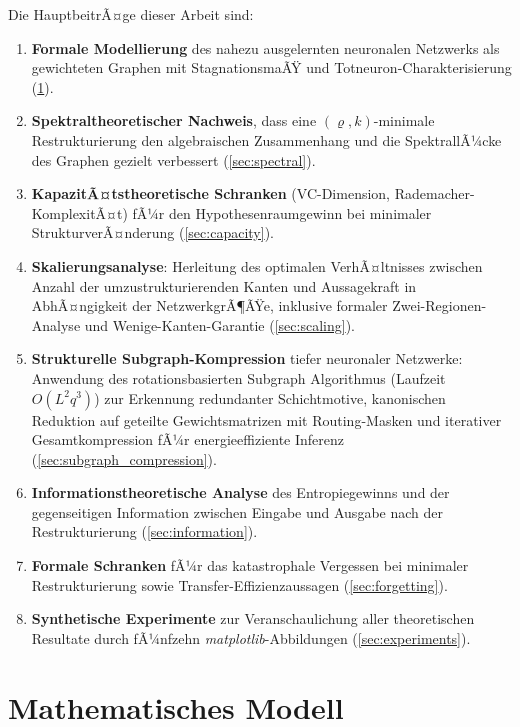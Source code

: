 ﻿\documentclass[12pt, a4paper, openany]{report}
\begin{document}
Die HauptbeitrÃ¤ge dieser Arbeit sind:
\begin{enumerate}[label=(\roman*)]
  \item \textbf{Formale Modellierung} des nahezu ausgelernten neuronalen
    Netzwerks als gewichteten Graphen mit StagnationsmaÃŸ und
    Totneuron-Charakterisierung (\cref{sec:model}).
  \item \textbf{Spektraltheoretischer Nachweis}, dass eine
    $(\varrho,k)$-minimale Restrukturierung den algebraischen
    Zusammenhang und die SpektrallÃ¼cke des Graphen gezielt verbessert
    (\cref{sec:spectral}).
  \item \textbf{KapazitÃ¤tstheoretische Schranken} (VC-Dimension,
    Rademacher-KomplexitÃ¤t) fÃ¼r den Hypothesenraumgewinn bei minimaler
    StrukturverÃ¤nderung (\cref{sec:capacity}).
  \item \textbf{Skalierungsanalyse}: Herleitung des optimalen VerhÃ¤ltnisses
    zwischen Anzahl der umzustrukturierenden Kanten und Aussagekraft in
    AbhÃ¤ngigkeit der NetzwerkgrÃ¶ÃŸe, inklusive formaler Zwei-Regionen-Analyse
    und Wenige-Kanten-Garantie (\cref{sec:scaling}).
  \item \textbf{Strukturelle Subgraph-Kompression} tiefer neuronaler
    Netzwerke: Anwendung des rotationsbasierten Subgraph Algorithmus
    (Laufzeit $O(L^2 q^3)$) zur Erkennung redundanter Schichtmotive,
    kanonischen Reduktion auf geteilte Gewichtsmatrizen mit Routing-Masken
    und iterativer Gesamtkompression fÃ¼r energieeffiziente Inferenz
    (\cref{sec:subgraph_compression}).
  \item \textbf{Informationstheoretische Analyse} des Entropiegewinns
    und der gegenseitigen Information zwischen Eingabe und Ausgabe nach
    der Restrukturierung (\cref{sec:information}).
  \item \textbf{Formale Schranken} fÃ¼r das katastrophale Vergessen bei
    minimaler Restrukturierung sowie Transfer-Effizienzaussagen
    (\cref{sec:forgetting}).
  \item \textbf{Synthetische Experimente} zur Veranschaulichung aller
    theoretischen Resultate durch fÃ¼nfzehn \textit{matplotlib}-Abbildungen
    (\cref{sec:experiments}).
\end{enumerate}

\chapter{Mathematisches Modell}
\label{sec:model}
\end{document}
